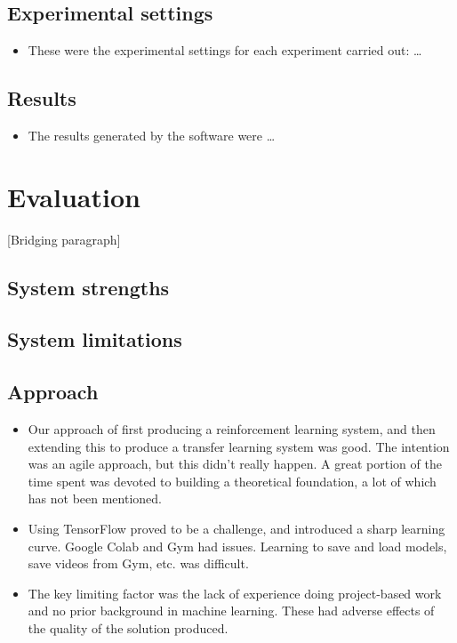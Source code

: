 \documentclass[12pt,a4paper]{article}
\begin{document}
\subsection{Experimental settings}
\begin{itemize}
    \item These were the experimental settings for each experiment carried out: \dots
\end{itemize}

\subsection{Results}
\begin{itemize}
    \item The results generated by the software were \dots
\end{itemize}

\newpage
\section{Evaluation}
[Bridging paragraph]
\subsection{System strengths} 

\subsection{System limitations}

\subsection{Approach}
\begin{itemize}
    \item Our approach of first producing a reinforcement learning system, and then extending this to produce a transfer learning system was good. The intention was an agile approach, but this didn't really happen. A great portion of the time spent was devoted to building a theoretical foundation, a lot of which has not been mentioned.
    \item Using TensorFlow proved to be a challenge, and introduced a sharp
    learning curve. Google Colab and Gym had issues. Learning to save and load models, save videos from Gym, etc. was difficult. 
    \item The key limiting factor was the lack of experience doing project-based work and no prior background in machine learning. These had adverse effects of the quality of the solution produced.
\end{itemize}
\end{document}
